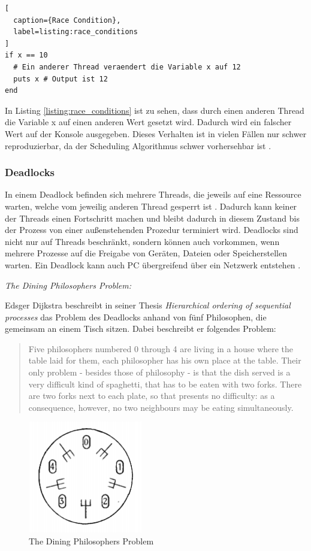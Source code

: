 \begin{lstlisting}[
  caption={Race Condition},
  label=listing:race_conditions
]
if x == 10
  # Ein anderer Thread veraendert die Variable x auf 12
  puts x # Output ist 12 
end
\end{lstlisting}

In Listing \ref{listing:race_conditions} ist zu sehen, dass durch einen anderen Thread die Variable x auf einen anderen Wert gesetzt wird. Dadurch wird ein falscher Wert auf der Konsole ausgegeben. Dieses Verhalten ist in vielen Fällen nur schwer reproduzierbar, da der Scheduling Algorithmus schwer vorhersehbar ist \cite[]{Net92}.

\subsubsection{Deadlocks}

In einem Deadlock befinden sich mehrere Threads, die jeweils auf eine Ressource warten, welche vom jeweilig anderen Thread gesperrt ist \cite[p. 1]{Jah04}. Dadurch kann keiner der Threads einen Fortschritt machen und bleibt dadurch in diesem Zustand bis der Prozess von einer außenstehenden Prozedur terminiert wird. Deadlocks sind nicht nur auf Threads beschränkt, sondern können auch vorkommen, wenn mehrere Prozesse auf die Freigabe von Geräten, Dateien oder Speicherstellen warten. Ein Deadlock kann auch PC übergreifend über ein Netzwerk entstehen \cite[p. 177]{tan09}. 

\emph{The Dining Philosophers Problem:}

Edsger Dijkstra beschreibt in seiner Thesis \emph{Hierarchical ordering of sequential processes} das Problem des Deadlocks anhand von fünf Philosophen, die gemeinsam an einem Tisch sitzen. Dabei beschreibt er folgendes Problem:

\begin{quote}
  Five philosophers numbered 0 through 4 are living in a house where the table laid for them, each philosopher has his own place at the table. Their only problem - besides those of philosophy - is that the dish served is a very difficult kind of spaghetti, that has to be eaten with two forks. There are two forks next to each plate, so that presents no difficulty: as a consequence, however, no two neighbours may be eating simultaneously. \cite[p. 21]{dij71}
\end{quote} 

\begin{figure}[!htb]
  \centering
  \includegraphics[width=5cm]{images/philosophers.png}
  \caption{
    The Dining Philosophers Problem \cite[p. 21]{dij71} 
  }
  \label{figure:philosophers}
\end{figure}

